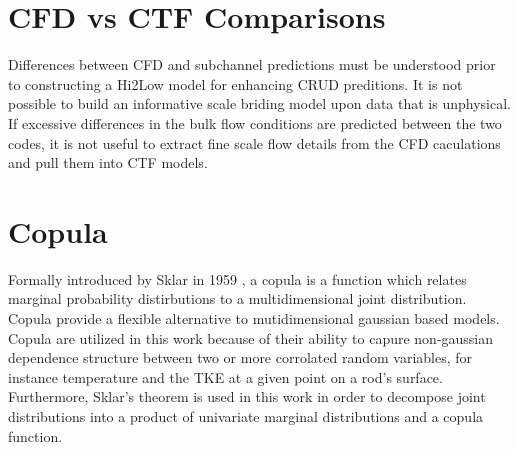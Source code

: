 \section{CFD vs CTF Comparisons}

Differences between CFD and subchannel predictions must be understood prior to constructing a Hi2Low model for enhancing CRUD preditions.  It is not possible to build an informative scale briding model upon data that is unphysical.  If excessive differences in the bulk flow conditions are predicted between the two codes, it is not useful to extract fine scale flow details from the CFD caculations and pull them into CTF models. 



\section{Copula}

Formally introduced by Sklar in 1959 \cite{Sklar1959}, a copula is a function which relates marginal probability distirbutions to a multidimensional joint distribution.  Copula provide a flexible alternative to mutidimensional gaussian based models.  Copula are utilized in this work because of their ability to capure non-gaussian dependence structure between two or more corrolated random variables, for instance temperature and the TKE at a given point on a rod's surface.  Furthermore, Sklar's theorem is used in this work in order to decompose joint distributions into a product of univariate marginal distributions and a copula function.  

